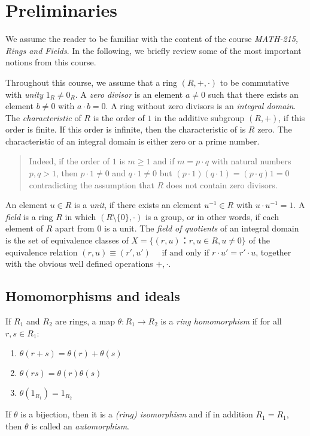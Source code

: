\chapter{Preliminaries}
\label{cha:preliminaries}


We assume the reader to be familiar with the content of the course \emph{MATH-215, Rings and Fields}. In the following, we briefly review some of the most important notions from this course.

Throughout this course, we assume that a ring $(R,+,⋅)$ to be commutative with \emph{unity}  $1_R \neq 0_R$. A \emph{zero divisor} is an element $a≠0$ such that there exists  an element $b≠0$ with $a⋅b = 0$. A ring without zero divisors is an  \emph{integral domain}. The \emph{characteristic} of $R$ is the order of $1$ in the additive subgroup $(R,+)$, if this order is finite. If this order is infinite, then the characteristic of is $R$ zero. The characteristic of an integral domain is either zero or a prime number.
\begin{quote}
  \small Indeed, if the order of $1$ is $m ≥1$ and if $m = p⋅q$ with natural numbers $p,q >1$, then $ p ⋅1≠ 0$ and   $q ⋅1≠0$ but  $ (p ⋅1 ) (q ⋅1) = (p⋅q) 1 = 0$ contradicting the assumption that $R$ does not contain zero divisors. 
\end{quote}


An element $u ∈ R$ is a  \emph{unit}, if there exists an element $u^{-1} ∈R$ with $u ⋅ u^{-1} = 1$. 
A \emph{field} is a ring $R$ in which $(R \setminus \{0\}, ⋅)$  is a group, or in other words, if each element of $R$ apart from $0$ is a unit. The \emph{field of quotients} of an integral domain is the set of equivalence classes of $X = \{ (r,u) ： r,u ∈R, u ≠0\}$ of the equivalence relation
$  (r,u) ≡ (r',u') \quad \text{ if  and only if } r ⋅ u' = r' ⋅ u$,  together with the obvious well defined operations $+, ⋅$.




\section{Homomorphisms and ideals}
\label{sec:homomorphisms-ideals}


If $R_1$ and $R_2$ are rings, a map  $θ: R_1 → R_2$ is a \emph{ring  homomorphism} if for all $r,s ∈R_1$:
\begin{enumerate}
\item $θ(r+s) = θ(r) + θ(s)$
\item $θ(rs) = θ(r) θ(s)$
\item $θ(1_{R_1}) = 1_{R_2} $ 
\end{enumerate}
If $θ$ is a bijection, then it is a \emph{(ring) isomorphism} and if in addition $R_1 = R_1$, then $θ$ is called an \emph{automorphism}.

